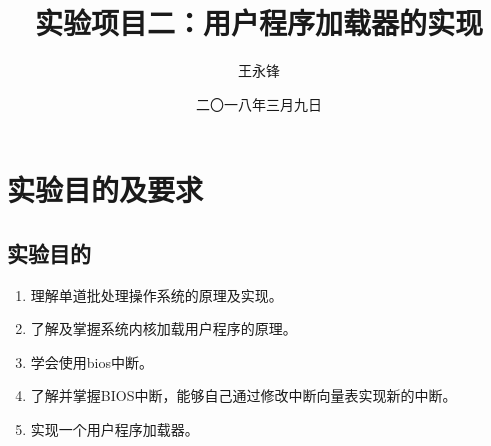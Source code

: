 \documentclass[forprint]{WHUBachelor}
\begin{document}

\title{实验项目二：用户程序加载器的实现}
\author{王永锋}                            %
\date{二〇一八年三月九日}                    %

\maketitle
\frontmatter
{}              %
\tableofcontents
\mainmatter %

\chapter{实验目的及要求}

\section{实验目的}

\begin{enumerate}
  \item 理解单道批处理操作系统的原理及实现。
  \item 了解及掌握系统内核加载用户程序的原理。
  \item 学会使用bios中断。
  \item 了解并掌握BIOS中断，能够自己通过修改中断向量表实现新的中断。
  \item 实现一个用户程序加载器。
\end{enumerate}
\end{document}
